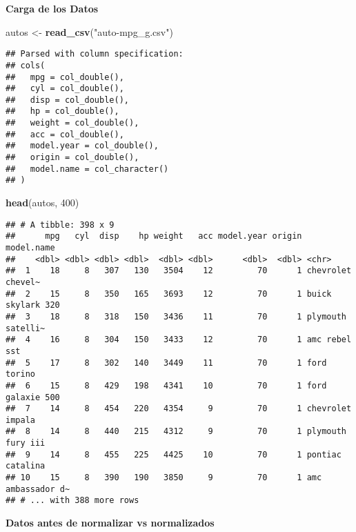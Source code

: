 \documentclass[]{article}
\newenvironment{Shaded}{\begin{snugshade}}{\end{snugshade}}
\newcommand{\DecValTok}[1]{\textcolor[rgb]{0.00,0.00,0.81}{#1}}
\newcommand{\KeywordTok}[1]{\textcolor[rgb]{0.13,0.29,0.53}{\textbf{#1}}}
\newcommand{\NormalTok}[1]{#1}
\newcommand{\OperatorTok}[1]{\textcolor[rgb]{0.81,0.36,0.00}{\textbf{#1}}}
\newcommand{\StringTok}[1]{\textcolor[rgb]{0.31,0.60,0.02}{#1}}
\begin{document}
\textbf{Carga de los Datos}

\begin{Shaded}
\begin{Highlighting}[]
\NormalTok{autos <-}\StringTok{ }\KeywordTok{read_csv}\NormalTok{(}\StringTok{"auto-mpg_g.csv"}\NormalTok{)}
\end{Highlighting}
\end{Shaded}

\begin{verbatim}
## Parsed with column specification:
## cols(
##   mpg = col_double(),
##   cyl = col_double(),
##   disp = col_double(),
##   hp = col_double(),
##   weight = col_double(),
##   acc = col_double(),
##   model.year = col_double(),
##   origin = col_double(),
##   model.name = col_character()
## )
\end{verbatim}

\begin{Shaded}
\begin{Highlighting}[]
\KeywordTok{head}\NormalTok{(autos, }\DecValTok{400}\NormalTok{)}
\end{Highlighting}
\end{Shaded}

\begin{verbatim}
## # A tibble: 398 x 9
##      mpg   cyl  disp    hp weight   acc model.year origin model.name       
##    <dbl> <dbl> <dbl> <dbl>  <dbl> <dbl>      <dbl>  <dbl> <chr>            
##  1    18     8   307   130   3504    12         70      1 chevrolet chevel~
##  2    15     8   350   165   3693    12         70      1 buick skylark 320
##  3    18     8   318   150   3436    11         70      1 plymouth satelli~
##  4    16     8   304   150   3433    12         70      1 amc rebel sst    
##  5    17     8   302   140   3449    11         70      1 ford torino      
##  6    15     8   429   198   4341    10         70      1 ford galaxie 500 
##  7    14     8   454   220   4354     9         70      1 chevrolet impala 
##  8    14     8   440   215   4312     9         70      1 plymouth fury iii
##  9    14     8   455   225   4425    10         70      1 pontiac catalina 
## 10    15     8   390   190   3850     9         70      1 amc ambassador d~
## # ... with 388 more rows
\end{verbatim}

\textbf{Datos antes de normalizar vs normalizados}

\begin{Shaded}
\end{Shaded}
\end{document}
